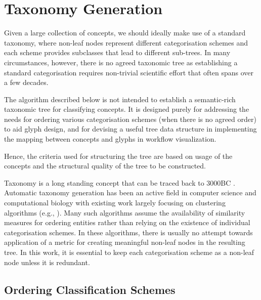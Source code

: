 \section{Taxonomy Generation}
\label{sec:Taxonomy}

Given a large collection of concepts, we should ideally make use of a standard taxonomy, where non-leaf nodes represent different categorisation schemes and each scheme provides subclasses that lead to different sub-trees. In many circumstances, however, there is no agreed taxonomic tree as establishing a standard categorisation requires non-trivial scientific effort that often spans over a few decades.

The algorithm described below is not intended to establish a semantic-rich taxonomic tree for classifying concepts.
It is designed purely for addressing the needs for ordering various categorisation schemes (when there is no agreed order) to aid glyph design, and for devising a useful tree data structure in implementing the mapping between concepts and glyphs in workflow visualization.

Hence, the criteria used for structuring the tree are based on usage of the concepts and the structural quality of the tree to be constructed.

Taxonomy is a long standing concept that can be traced back to 3000BC \cite{maguire12}. Automatic taxonomy generation has been an active field in computer science and computational biology with existing work largely focusing on clustering algorithms (e.g., \cite{krishnapuram03}). Many such algorithms assume the availability of similarity measures for ordering entities rather than relying on the existence of individual categorisation schemes. In these algorithms, there is usually no attempt towards application of a metric for creating meaningful non-leaf nodes in the resulting tree. In this work, it is essential to keep each categorisation scheme as a non-leaf node unless it is redundant.

\subsection{Ordering Classification Schemes}
\label{sec:Algorithm}

